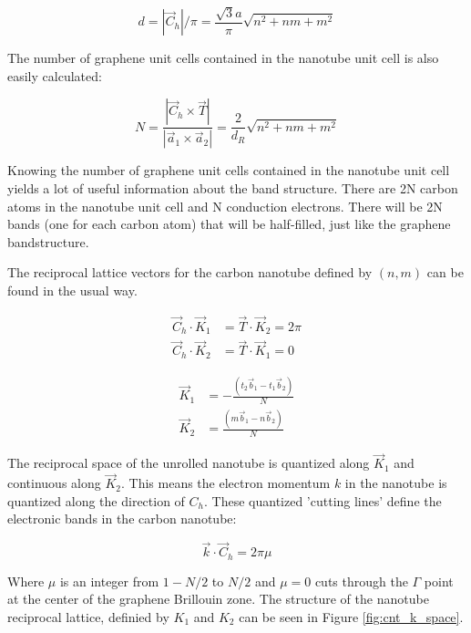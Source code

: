 \begin{equation}
    d = \left| \vec{C}_h \right|/\pi = \frac{\sqrt{3}a}{\pi}\sqrt{n^2+nm+m^2}
    \label{eq:cnt_diameter}
\end{equation}

The number of graphene unit cells contained in the nanotube unit cell is also easily calculated:

\begin{equation}
    N = \frac{\left| \vec{C}_h \times \vec{T} \right|}{\left| \vec{a}_1 \times \vec{a}_2 \right|} = \frac{2}{d_R}\sqrt{n^2+nm+m^2}
    \label{eq:cnt_N}
\end{equation}

Knowing the number of graphene unit cells contained in the nanotube unit cell yields a lot of useful information about the band structure. There are 2N carbon atoms in the nanotube unit cell and N conduction electrons. There will be 2N bands (one for each carbon atom) that will be half-filled, just like the graphene bandstructure.

The reciprocal lattice vectors for the carbon nanotube defined by $(n,m)$ can be found in the usual way.

\begin{align}
    \vec{C}_h\cdot\vec{K}_1 &= \vec{T}\cdot\vec{K}_2 = 2\pi \nonumber \\
    \vec{C}_h\cdot\vec{K}_2 &= \vec{T}\cdot\vec{K}_1 = 0 \label{eq:cnt_recip}
\end{align}
    
\begin{align}
    \vec{K}_1 &= -\frac{(t_2 \vec{b}_1 - t_1 \vec{b}_2)}{N} \nonumber \\
    \vec{K}_2 &= \frac{(m \vec{b}_1 - n \vec{b}_2)}{N} \label{eq:K1_K2}
\end{align}

The reciprocal space of the unrolled nanotube is quantized along $\vec{K}_1$ and continuous along $\vec{K}_2$. This means the electron momentum $k$ in the nanotube is quantized along the direction of $C_h$. These quantized 'cutting lines' define the electronic bands in the carbon nanotube:

\begin{equation}
    \vec{k}\cdot\vec{C}_h = 2\pi\mu
\end{equation}

Where $\mu$ is an integer from $1-N/2$ to $N/2$ and $\mu=0$ cuts through the $\Gamma$ point at the center of the graphene Brillouin zone. The structure of the nanotube reciprocal lattice, definied by $K_1$ and $K_2$ can be seen in Figure \ref{fig:cnt_k_space}. 


